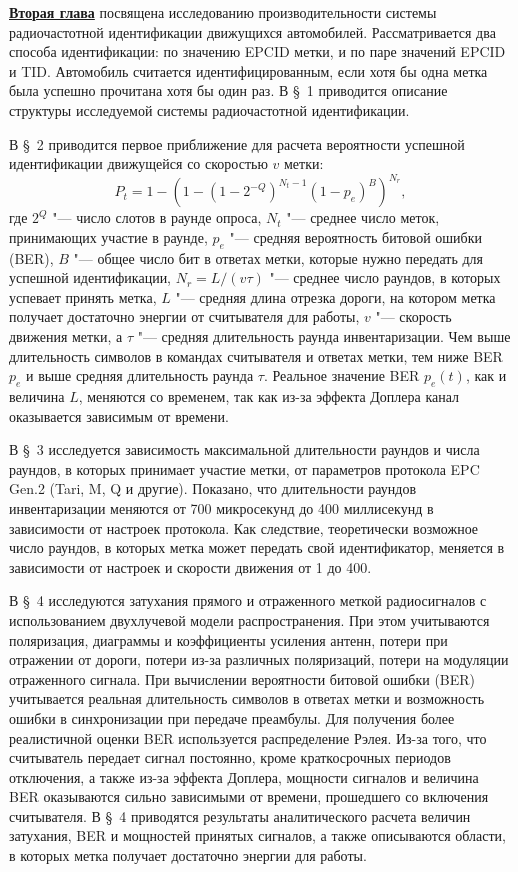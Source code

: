 \underline{\textbf{Вторая глава}} посвящена исследованию производительности системы радиочастотной идентификации движущихся автомобилей. Рассматривается два способа идентификации: по значению EPCID метки, и по паре значений EPCID и TID. Автомобиль считается идентифицированным, если хотя бы одна метка была успешно прочитана хотя бы один раз. В \S~1 приводится описание структуры исследуемой системы радиочастотной идентификации.

В \S~2 приводится первое приближение для расчета вероятности успешной идентификации движущейся со скоростью $v$ метки:
\[
P_t = 1 - \left( 1 - (1 - 2^{-Q})^{N_t-1} (1 - p_e)^B \right)^{N_r},
\]
где $2^Q$ "--- число слотов в раунде опроса, $N_t$ "--- среднее число меток, принимающих участие в раунде, $p_e$ "--- средняя вероятность битовой ошибки (BER), $B$ "--- общее число бит в ответах метки, которые нужно передать для успешной идентификации, $N_r = L / (v \tau)$ "--- среднее число раундов, в которых успевает принять метка, $L$ "--- средняя длина отрезка дороги, на котором метка получает достаточно энергии от считывателя для работы, $v$ "--- скорость движения метки, а $\tau$ "--- средняя длительность раунда инвентаризации. Чем выше длительность символов в командах считывателя и ответах метки, тем ниже BER $p_e$ и выше средняя длительность раунда $\tau$. Реальное значение BER $p_e(t)$, как и величина $L$, меняются со временем, так как из-за эффекта Доплера канал оказывается зависимым от времени.

В \S~3 исследуется зависимость максимальной длительности раундов и числа раундов, в которых принимает участие метки, от параметров протокола EPC Gen.2 (Tari, M, Q и другие). Показано, что длительности раундов инвентаризации меняются от 700 микросекунд до 400 миллисекунд в зависимости от настроек протокола. Как следствие, теоретически возможное число раундов, в которых метка может передать свой идентификатор, меняется в зависимости от настроек и скорости движения от 1 до 400.

В \S~4 исследуются затухания прямого и отраженного меткой радиосигналов с использованием двухлучевой модели распространения. При этом учитываются поляризация, диаграммы и коэффициенты усиления антенн, потери при отражении от дороги, потери из-за различных поляризаций, потери на модуляции отраженного сигнала. При вычислении вероятности битовой ошибки (BER) учитывается реальная длительность символов в ответах метки и возможность ошибки в синхронизации при передаче преамбулы. Для получения более реалистичной оценки BER используется распределение Рэлея. Из-за того, что считыватель передает сигнал постоянно, кроме краткосрочных периодов отключения, а также из-за эффекта Доплера, мощности сигналов и величина BER оказываются сильно зависимыми от времени, прошедшего со включения считывателя. В \S~4 приводятся результаты аналитического расчета величин затухания, BER и мощностей принятых сигналов, а также описываются области, в которых метка получает достаточно энергии для работы.

